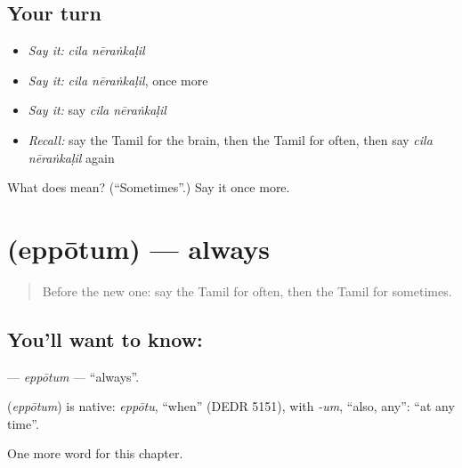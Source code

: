 \subsection*{Your turn}
\begin{itemize}
\raggedright
  \item \emph{Say it:} \emph{cila nēraṅkaḷil}
  \item \emph{Say it:} \emph{cila nēraṅkaḷil}, once more
  \item \emph{Say it:} say \emph{cila nēraṅkaḷil}
  \item \emph{Recall:} say the Tamil for the brain, then the Tamil for often, then say \emph{cila nēraṅkaḷil} again
\end{itemize}

\begin{tcolorbox}[breakable,colback=teal!4,colframe=teal!35!black,title={Before you move on}]
What does   mean? (\textquotedblleft{}Sometimes\textquotedblright{}.) Say it once more.
\end{tcolorbox}
\section[\texorpdfstring{\ta{எப்போதும்} (eppōtum)}{எப்போதும் (eppōtum)}]{ (eppōtum) — always}

\label{lesson:TA-C171-eppotum}



\begin{quote}
Before the new one: say the Tamil for often, then the Tamil for sometimes.
\end{quote}

\subsection*{You'll want to know: }
\textbf{} — \emph{eppōtum} — \textquotedblleft{}always\textquotedblright{}.

\begin{cousinweb}
\textbf{} (\emph{eppōtum}) is native: \emph{eppōtu}, \textquotedblleft{}when\textquotedblright{} (DEDR 5151), with \emph{-um}, \textquotedblleft{}also, any\textquotedblright{}: \textquotedblleft{}at any time\textquotedblright{}.
\end{cousinweb}

\begin{grammarlens}[title={What you've built}]
One more word for this chapter.
\end{grammarlens}


